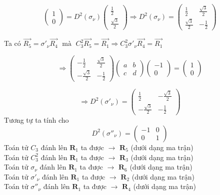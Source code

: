 \documentclass{report}
\begin{document}
\[
	\renewcommand{\arraystretch}{0.75}
	\begin{pmatrix}
		1 \\
		0
	\end{pmatrix}
	= D^2(\sigma_\nu)
	\begin{pmatrix}
		\frac{1}{2} \\
		\frac{\sqrt{3}}{2}
	\end{pmatrix}
	\Rightarrow  D^2(\sigma_\nu) =
	\begin{pmatrix}
		\frac{1}{2}        & \frac{\sqrt{3}}{2} \\
		\frac{\sqrt{3}}{2} & -\frac{1}{2}
	\end{pmatrix}
\]

Ta có $ \vec{R_5} = \sigma'_\nu \vec{R_4} \; \text{ mà }\; C_3^2 \vec{R_5} =
	\vec{R_1} \Rightarrow C_3^2 \sigma'_\nu \vec{R_4} = \vec{R_1}$

\[
	\renewcommand{\arraystretch}{0.75}
	\Rightarrow
	\begin{pmatrix}
		-\frac{1}{2}        & \frac{\sqrt{3}}{2} \\
		-\frac{\sqrt{3}}{2} & -\frac{1}{2}
	\end{pmatrix}
	\begin{pmatrix}
		a & b \\
		c & d
	\end{pmatrix}
	\begin{pmatrix}
		-1 \\
		0
	\end{pmatrix}
	=
	\begin{pmatrix}
		1 \\
		0
	\end{pmatrix}
\]

\[
	\renewcommand{\arraystretch}{0.75}
	\Rightarrow D^2\left(\sigma'_\nu\right) =
	\begin{pmatrix}
		\frac{1}{2}         & -\frac{\sqrt{3}}{2} \\
		-\frac{\sqrt{3}}{2} & -\frac{1}{2}
	\end{pmatrix}
\]
Tương tự ta tính cho
\[
	\renewcommand{\arraystretch}{0.75}
	D^2\left(\sigma''_\nu\right) =
	\begin{pmatrix}
		-1 & 0 \\
		0  & 1
	\end{pmatrix}
\]
\noindent Toán tử $C_3$ đánh lên $\textbf{R}_1$ ta được $\rightarrow$ $\textbf{R}_5$ (dưới dạng ma trận)\\
Toán tử $C_3^2$ đánh lên $\textbf{R}_1$ ta được $\rightarrow$ $\textbf{R}_3$ (dưới dạng ma trận)\\
Toán tử $\sigma_\nu$ đánh lên $\textbf{R}_1$ ta được $\rightarrow$ $\textbf{R}_6$ (dưới dạng ma trận)\\
Toán tử $\sigma'_\nu$ đánh lên $\textbf{R}_1$ ta được $\rightarrow$ $\textbf{R}_2$ (dưới dạng ma trận)\\
Toán tử $\sigma''_\nu$ đánh lên $\textbf{R}_1$ ta được $\rightarrow$ $\textbf{R}_4$ (dưới dạng ma trận)
\end{document}
